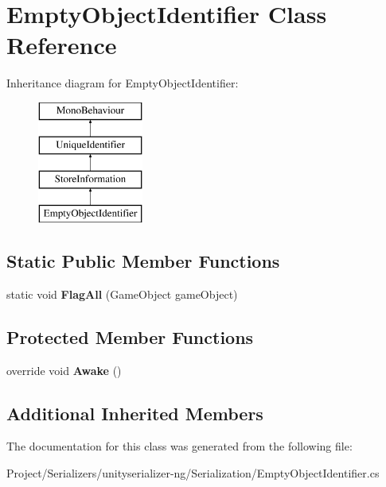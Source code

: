 \hypertarget{class_empty_object_identifier}{}\section{Empty\+Object\+Identifier Class Reference}
\label{class_empty_object_identifier}
Inheritance diagram for Empty\+Object\+Identifier\+:\begin{figure}[H]
\begin{center}
\leavevmode
\includegraphics[height=4.000000cm]{class_empty_object_identifier}
\end{center}
\end{figure}
\subsection*{Static Public Member Functions}
\begin{DoxyCompactItemize}
\item 
\mbox{\label{class_empty_object_identifier_ad2d9725d5326b826351ed11c539934d5}} 
static void {\bfseries Flag\+All} (Game\+Object game\+Object)
\end{DoxyCompactItemize}
\subsection*{Protected Member Functions}
\begin{DoxyCompactItemize}
\item 
\mbox{\label{class_empty_object_identifier_abb11a8f33d5c145640db3e69b6d34f10}} 
override void {\bfseries Awake} ()
\end{DoxyCompactItemize}
\subsection*{Additional Inherited Members}


The documentation for this class was generated from the following file\+:\begin{DoxyCompactItemize}
\item 
Project/\+Serializers/unityserializer-\/ng/\+Serialization/Empty\+Object\+Identifier.\+cs\end{DoxyCompactItemize}
